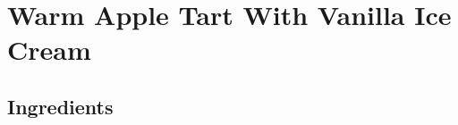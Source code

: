 \thispagestyle{fancy}
\section{Warm Apple Tart With Vanilla Ice Cream}
\AddToShipoutPicture*{\AppleTart}

\subsection*{Ingredients}